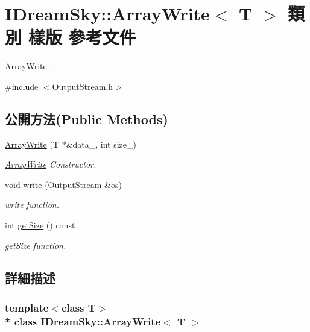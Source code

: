 \hypertarget{class_i_dream_sky_1_1_array_write}{}\section{I\+Dream\+Sky\+:\+:Array\+Write$<$ T $>$ 類別 樣版 參考文件}
\label{class_i_dream_sky_1_1_array_write}


\hyperlink{class_i_dream_sky_1_1_array_write}{Array\+Write}.  




{\ttfamily \#include $<$Output\+Stream.\+h$>$}

\subsection*{公開方法(Public Methods)}
\begin{DoxyCompactItemize}
\item 
\hyperlink{class_i_dream_sky_1_1_array_write_a87ab6284a40dcc5b1b6092d160474edb}{Array\+Write} (T $\ast$\&data\+\_\+, int size\+\_\+)
\begin{DoxyCompactList}\small\item\em \hyperlink{class_i_dream_sky_1_1_array_write}{Array\+Write} Constructor. \end{DoxyCompactList}\item 
void \hyperlink{class_i_dream_sky_1_1_array_write_aff48860458b36b1ce845fe0a884821aa}{write} (\hyperlink{class_i_dream_sky_1_1_output_stream}{Output\+Stream} \&os)
\begin{DoxyCompactList}\small\item\em write function. \end{DoxyCompactList}\item 
int \hyperlink{class_i_dream_sky_1_1_array_write_a232b7d0b7b4538ab65dbfa79caab9857}{get\+Size} () const 
\begin{DoxyCompactList}\small\item\em get\+Size function. \end{DoxyCompactList}\end{DoxyCompactItemize}


\subsection{詳細描述}
\subsubsection*{template$<$class T$>$\\*
class I\+Dream\+Sky\+::\+Array\+Write$<$ T $>$}

